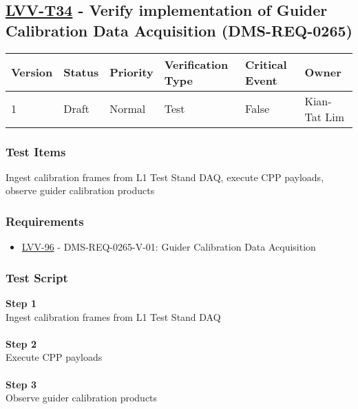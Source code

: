 \hypertarget{lvv-t34---verify-implementation-of-guider-calibration-data-acquisition-dms-req-0265}{%
\subsection{\texorpdfstring{\href{https://jira.lsstcorp.org/secure/Tests.jspa\#/testCase/LVV-T34}{LVV-T34}
- Verify implementation of Guider Calibration Data Acquisition
(DMS-REQ-0265)}{LVV-T34 - Verify implementation of Guider Calibration Data Acquisition (DMS-REQ-0265)}}\label{lvv-t34---verify-implementation-of-guider-calibration-data-acquisition-dms-req-0265}}

\begin{longtable}[]{@{}llllll@{}}
\toprule
Version & Status & Priority & Verification Type & Critical Event &
Owner\tabularnewline
\midrule
\endhead
1 & Draft & Normal & Test & False & Kian-Tat Lim\tabularnewline
\bottomrule
\end{longtable}

\hypertarget{test-items-123}{%
\subsubsection{Test Items}\label{test-items-123}}

{Ingest calibration frames from L1 Test Stand DAQ, execute CPP payloads,
observe guider calibration products}

\hypertarget{requirements-124}{%
\subsubsection{Requirements}\label{requirements-124}}

\begin{itemize}
\tightlist
\item
  \href{https://jira.lsstcorp.org/browse/LVV-96}{LVV-96} -
  DMS-REQ-0265-V-01: Guider Calibration Data Acquisition
\end{itemize}

\hypertarget{test-script-124}{%
\subsubsection{Test Script}\label{test-script-124}}

\textbf{Step 1}\\
{Ingest calibration frames from L1 Test Stand DAQ}\\
~\\
\textbf{Step 2}\\
Execute CPP payloads\\
~\\
\textbf{Step 3}\\
Observe guider calibration products\\
~\\

